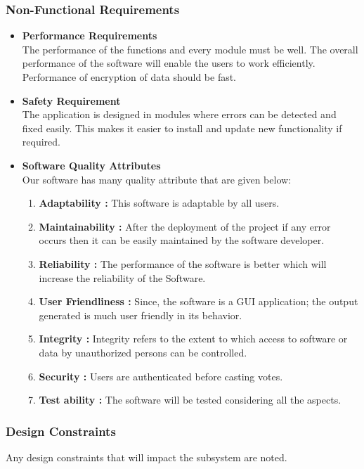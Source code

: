 \documentclass[oneside, 12pt]{book}
\begin{document}
			\subsubsection{Non-Functional Requirements}
				\begin{itemize}
					\item\textbf{Performance Requirements}\\The performance of the functions and every module must be well. The overall performance of the software will enable the users to work efficiently. Performance of encryption of data should be fast.
					\item\textbf{Safety Requirement}\\The application is designed in modules where errors can be detected and fixed easily. This makes it easier to install and update new functionality if required.
					\item\textbf{Software Quality Attributes}\\Our software has many quality attribute that are given below:
						\begin{enumerate}
							\item\textbf{Adaptability :} This software is adaptable by all users.
							\item\textbf{Maintainability :} After the deployment of the project if any error occurs then it can be easily maintained by the software developer.
							\item\textbf{Reliability :} The performance of the software is better which will increase the reliability of the Software.
							\item\textbf{User Friendliness :} Since, the software is a GUI application; the output generated is much user friendly in its behavior.
							\item\textbf{Integrity :} Integrity refers to the extent to which access to software or data by unauthorized persons can be controlled.
							\item\textbf{Security :} Users are authenticated before casting votes.
							\item\textbf{Test ability :} The software will be tested considering all the aspects.
						\end{enumerate}
				\end{itemize}
			\subsubsection{Design Constraints}
				Any design constraints that will impact the subsystem are noted.
\end{document}

